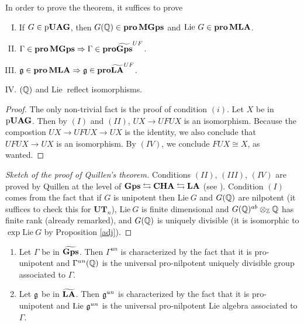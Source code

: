 \begin{cor}
In order to prove the theorem, it suffices to prove
\begin{enumerate}[(I)]
	\item If $G\in\operatorname{p\bf{UAG}}$, then $G(\mathbb{Q})\in{\bf{pro}}\operatorname{\bf{MGps}}$ and $\mathrm{Lie~} G\in{\bf{pro}}\operatorname{\bf{MLA}}$.
	\item $\Gamma\in{\bf{pro}}\operatorname{\bf{MGps}}\Rightarrow\Gamma\in {\bf{pro}}\widetilde{\operatorname{\bf{Gps}}}^{UF}$.
	\item $\mathfrak{g}\in{\bf{pro}}\operatorname{\bf{MLA}}\Rightarrow\mathfrak{g}\in {\bf{pro}}\widetilde{\operatorname{\bf{LA}}}^{UF}$.
	\item $(\mathbb{Q})$ and $\mathrm{Lie~}$ reflect isomorphisms.
\end{enumerate}
\end{cor}

\begin{proof}
The only non-trivial fact is the proof of condition $(i)$. Let $X$ be in $\operatorname{p\bf{UAG}}$. Then by $(I)$ and $(II)$, $UX\to UFUX$ is an isomorphism. Because the compostion $UX\to UFUX\to UX$ is the identity, we also conclude that $UFUX\to UX$ is an isomorphism. By $(IV)$, we conclude $FUX\cong X$, as wanted.
\end{proof}

\begin{proof}[Sketch of the proof of Quillen's theorem]
Conditions $(II)$, $(III)$, $(IV)$ are proved by Quillen at the level of $\operatorname{\bf{Gps}}\leftrightarrows\operatorname{\bf{CHA}}\leftrightarrows\operatorname{\bf{LA}}$ (see \cite[Theorem A.3.3]{quillen-r}). Condition $(I)$ comes from the fact that if $G$ is unipotent then $\mathrm{Lie~} G$ and $G(\mathbb{Q})$ are nilpotent (it suffices to check this for $\mathbf{UT}_n$), $\mathrm{Lie~} G$ is finite dimensional and $G(\mathbb{Q})^{ab}\otimes_{\mathbb{Z}}\mathbb{Q}$ has finite rank (already remarked), and $G(\mathbb{Q})$ is uniquely divisible (it is isomorphic to $\exp\mathrm{Lie~} G$ by Proposition \ref{adj}).
\end{proof}

\begin{cor}\label{univ}
\begin{enumerate}
	\item Let $\Gamma$ be in $\widetilde{\operatorname{\bf{Gps}}}$. Then $\Gamma^{un}$ is characterized by the fact that it is pro-unipotent and $\Gamma^{un}(\mathbb{Q})$ is the universal pro-nilpotent uniquely divisible group associated to $\Gamma$.
	\item Let $\mathfrak{g}$ be in $\widetilde{\operatorname{\bf{LA}}}$. Then $\mathfrak{g}^{un}$ is characterized by the fact that it is pro-unipotent and $\mathrm{Lie~}\mathfrak{g}^{un}$ is the universal pro-nilpotent Lie algebra associated to $\Gamma$.
\end{enumerate}
\end{cor}

